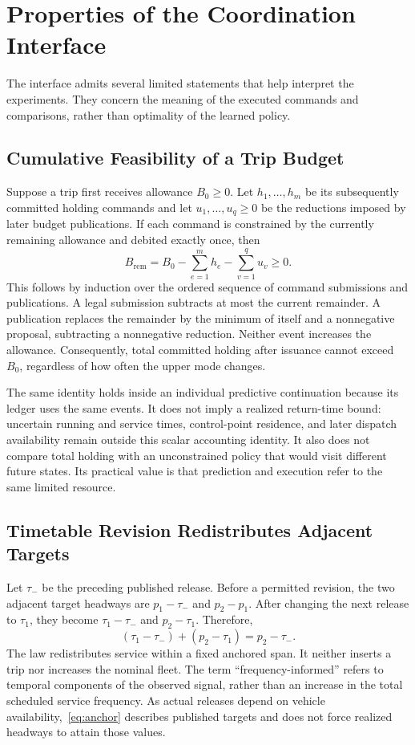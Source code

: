 \section{Properties of the Coordination Interface}
\label{sec:properties}
The interface admits several limited statements that help interpret the experiments. They concern the meaning of the executed commands and comparisons, rather than optimality of the learned policy.

\subsection{Cumulative Feasibility of a Trip Budget}
Suppose a trip first receives allowance $B_0\geq0$. Let $h_1,\ldots,h_m$ be its subsequently committed holding commands and let $u_1,\ldots,u_q\geq0$ be the reductions imposed by later budget publications. If each command is constrained by the currently remaining allowance and debited exactly once, then
\begin{equation}
 B_{\mathrm{rem}}=B_0-\sum_{e=1}^{m}h_e-\sum_{v=1}^{q}u_v\geq0.
 \label{eq:budget_identity}
\end{equation}
This follows by induction over the ordered sequence of command submissions and publications. A legal submission subtracts at most the current remainder. A publication replaces the remainder by the minimum of itself and a nonnegative proposal, subtracting a nonnegative reduction. Neither event increases the allowance. Consequently, total committed holding after issuance cannot exceed $B_0$, regardless of how often the upper mode changes.

The same identity holds inside an individual predictive continuation because its ledger uses the same events. It does not imply a realized return-time bound: uncertain running and service times, control-point residence, and later dispatch availability remain outside this scalar accounting identity. It also does not compare total holding with an unconstrained policy that would visit different future states. Its practical value is that prediction and execution refer to the same limited resource.

\subsection{Timetable Revision Redistributes Adjacent Targets}
Let $\tau_-$ be the preceding published release. Before a permitted revision, the two adjacent target headways are $p_1-\tau_-$ and $p_2-p_1$. After changing the next release to $\tau_1$, they become $\tau_1-\tau_-$ and $p_2-\tau_1$. Therefore,
\begin{equation}
 (\tau_1-\tau_-)+(p_2-\tau_1)=p_2-\tau_-.
 \label{eq:anchor}
\end{equation}
The law redistributes service within a fixed anchored span. It neither inserts a trip nor increases the nominal fleet. The term ``frequency-informed'' refers to temporal components of the observed signal, rather than an increase in the total scheduled service frequency. As actual releases depend on vehicle availability,~\eqref{eq:anchor} describes published targets and does not force realized headways to attain those values.

